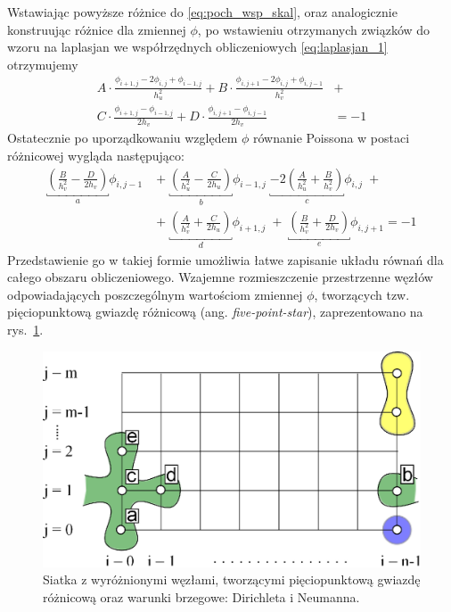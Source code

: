 \noindent Wstawiając powyższe różnice do \ref{eq:poch_wsp_skal}, oraz analogicznie konstruując różnice dla zmiennej $\phi$, po wstawieniu otrzymanych związków do wzoru na laplasjan we współrzędnych obliczeniowych \ref{eq:laplasjan_1} otrzymujemy 
\begin{equation}
\begin{split}
A\cdot\frac{\phi_{i+1,j}-2\phi_{i,j}+\phi_{i-1,j}}{h_u^2}+B\cdot\frac{\phi_{i,j+1}-2\phi_{i,j}+\phi_{i,j-1}}{h_v^2}&+ \\ C\cdot\frac{\phi_{i+1,j}-\phi_{i-1,j}}{2h_v}+D\cdot\frac{\phi_{i,j+1}-\phi_{i,j-1}}{2h_v}&=-1
\end{split}
\end{equation}
\newpage \noindent Ostatecznie po uporządkowaniu względem $\phi$ równanie Poissona w postaci różnicowej wygląda następująco:
\begin{equation}
\begin{split}
\underbracket{\left(\frac{B}{h_v^2}-\frac{D}{2h_v}\right)}_{a}\phi_{i,j-1}\;&+\;\underbracket{\left(\frac{A}{h_u^2}-\frac{C}{2h_u}\right)}_{b}\phi_{i-1,j} \;\underbracket{-2\left(\frac{A}{h_u^2}+ 
\frac{B}{h_v^2}\right)}_{c}\phi_{i,j}\;+ \\ &+\; \underbracket{\left(\frac{A}{h_v^2} + \frac{C}{2h_u}\right)}_{d}\phi_{i+1,j}\;+\; \underbracket{\left(\frac{B}{h_v^2}+\frac{D}{2h_v}\right)}_{e}\phi_{i,j+1}=-1
\end{split}
\label{eq:poisson_roznicowo}
\end{equation}
\newline
\noindent Przedstawienie go w takiej formie umożliwia łatwe zapisanie układu równań dla całego obszaru obliczeniowego. Wzajemne rozmieszczenie przestrzenne węzłów odpowiadających poszczególnym wartościom zmiennej $\phi$, tworzących tzw. pięciopunktową gwiazdę różnicową (ang. \textit{five-point-star}), zaprezentowano na rys.~\ref{fig:wezly}.

\begin{figure}[h]
  \centering
    \includegraphics[scale=0.8]{Rysunki/gwiazda_roznicowa.eps}
  \caption{Siatka z wyróżnionymi węzłami, tworzącymi pięciopunktową \colorbox{green!70!blue!30}{gwiazdę różnicową} oraz warunki brzegowe: \colorbox{blue!30}{Dirichleta} i \colorbox{yellow!50}{Neumanna}.
  \label{fig:wezly}}
\end{figure}

